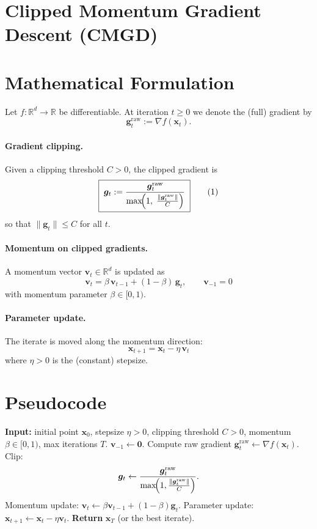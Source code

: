 \documentclass{article}
\begin{document}
\section*{Clipped Momentum Gradient Descent (CMGD)}

\section*{Mathematical Formulation}
Let $f:\mathbb{R}^d\rightarrow\mathbb{R}$ be differentiable.  
At iteration $t\ge 0$ we denote the (full) gradient by 
\[
\bm{g}_t^{\text{raw}}:=\nabla f(\bm{x}_t).
\]

\paragraph{Gradient clipping.}
Given a clipping threshold $C>0$, the clipped gradient is
\[
\boxed{\;
\bm{g}_t:=\frac{\bm{g}_t^{\text{raw}}}{\max\!\Bigl(1,\;\frac{\|\bm{g}_t^{\text{raw}}\|}{C}\Bigr)}\;}
\tag{1}
\]
so that $\|\bm{g}_t\|\le C$ for all $t$.

\paragraph{Momentum on clipped gradients.}
A momentum vector $\bm{v}_t\in\mathbb{R}^d$ is updated as
\[
\boxed{\;
\bm{v}_{t}= \beta\,\bm{v}_{t-1}+(1-\beta)\,\bm{g}_t,\qquad \bm{v}_{-1}=0\;}
\tag{2}
\]
with momentum parameter $\beta\in[0,1)$.

\paragraph{Parameter update.}
The iterate is moved along the momentum direction:
\[
\boxed{\;
\bm{x}_{t+1}= \bm{x}_t-\eta\,\bm{v}_t\;}
\tag{3}
\]
where $\eta>0$ is the (constant) stepsize.

\section*{Pseudocode}
\begin{algorithm}[H]
\caption{Clipped Momentum Gradient Descent (CMGD)}
\begin{algorithmic}[1]
\STATE \textbf{Input:} initial point $\bm{x}_0$, stepsize $\eta>0$, clipping threshold $C>0$, momentum $\beta\in[0,1)$, max iterations $T$.
\STATE $\bm{v}_{-1}\gets \bm{0}$.
    \STATE Compute raw gradient $\bm{g}^{\text{raw}}_t\gets \nabla f(\bm{x}_t)$.
    \STATE Clip: 
    \[
    \bm{g}_t\gets\frac{\bm{g}^{\text{raw}}_t}{\max\!\Bigl(1,\frac{\|\bm{g}^{\text{raw}}_t\|}{C}\Bigr)} .
    \]
    \STATE Momentum update: $\bm{v}_t\gets \beta\bm{v}_{t-1}+(1-\beta)\bm{g}_t$.
    \STATE Parameter update: $\bm{x}_{t+1}\gets \bm{x}_t-\eta\bm{v}_t$.
\ENDFOR
\STATE \textbf{Return} $\bm{x}_T$ (or the best iterate).
\end{algorithmic}
\end{algorithm}
\end{document}
